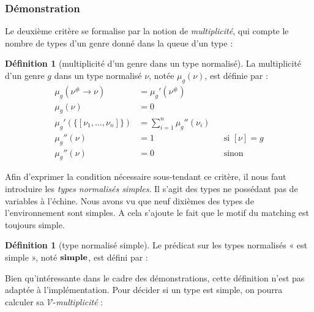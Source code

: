 \documentclass[a4paper]{report}
\theoremstyle{definition}
\newtheorem{definition}[theoreme]{Définition}
\newcommand{\interval}[2]{[\![#1\,;#2]\!]}
\newcommand{\mset}[1]{\{\![#1]\!\}}
\newcommand{\V}{\mathscr{V}}
\begin{document}
\subsubsection{Démonstration}

Le deuxième critère se formalise par la notion de \emph{multiplicité}, qui compte le nombre de types d'un genre donné dans la queue d'un type :

\begin{definition}[multiplicité d'un genre dans un type normalisé]
  La multiplicité d'un genre $g$ dans un type normalisé $\nu$, notée $\mu_g (\nu)$, est définie par :
  \begin{align*}
      \mu_g (\nu^\# \rightarrow \nu) &=
      \mu_g' (\nu^\#)
    \\
      \mu_g (\nu) &=
      0
    \\
      \mu_g' (\mset{\nu_1, \dots, \nu_n}) &=
      \sum_{i=1}^n \mu_g'' (\nu_i)
    \\
      \mu_g'' (\nu) &=
      1 &&
      \text{si } [\nu] = g
    \\
      \mu_g'' (\nu) &=
      0 &&
      \text{sinon}
  \end{align*}
\end{definition}

Afin d'exprimer la condition nécessaire sous-tendant ce critère, il nous faut introduire les \emph{types normalisés simples}. Il s'agit des types ne possédant pas de variables à l'échine. Nous avons vu que neuf dixièmes des types de l'environnement sont simples. A cela s'ajoute le fait que le motif du matching est toujours simple.

\begin{definition}[type normalisé simple]
  Le prédicat sur les types normalisés « est simple », noté $\bold{simple}$, est défini par :
\end{definition}

Bien qu'intéressante dans le cadre des démonstrations, cette définition n'est pas adaptée à l'implémentation. Pour décider si un type est simple, on pourra calculer sa $\V$-\emph{multiplicité} :
\end{document}
